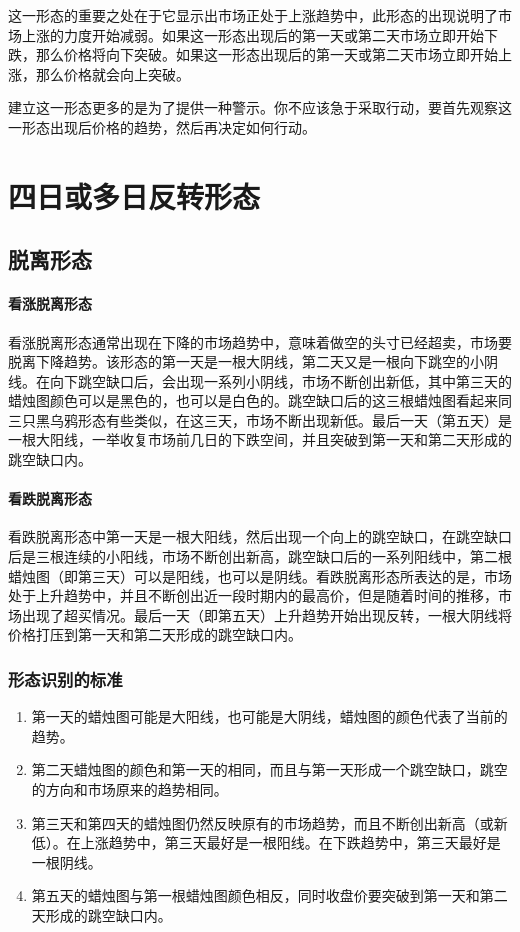 这一形态的重要之处在于它显示出市场正处于上涨趋势中，此形态的出现说明了市场上涨的力度开始减弱。如果这一形态出现后的第一天或第二天市场立即开始下跌，那么价格将向下突破。如果这一形态出现后的第一天或第二天市场立即开始上涨，那么价格就会向上突破。

\begin{tcolorbox}[title=请注意]
    建立这一形态更多的是为了提供一种警示。你不应该急于采取行动，要首先观察这一形态出现后价格的趋势，然后再决定如何行动。
\end{tcolorbox}

\section{四日或多日反转形态}
\subsection{脱离形态}
\paragraph{看涨脱离形态} 看涨脱离形态通常出现在下降的市场趋势中，意味着做空的头寸已经超卖，市场要脱离下降趋势。该形态的第一天是一根大阴线，第二天又是一根向下跳空的小阴线。在向下跳空缺口后，会出现一系列小阴线，市场不断创出新低，其中第三天的蜡烛图颜色可以是黑色的，也可以是白色的。跳空缺口后的这三根蜡烛图看起来同三只黑乌鸦形态有些类似，在这三天，市场不断出现新低。最后一天（第五天）是一根大阳线，一举收复市场前几日的下跌空间，并且突破到第一天和第二天形成的跳空缺口内。
\paragraph{看跌脱离形态} 看跌脱离形态中第一天是一根大阳线，然后出现一个向上的跳空缺口，在跳空缺口后是三根连续的小阳线，市场不断创出新高，跳空缺口后的一系列阳线中，第二根蜡烛图（即第三天）可以是阳线，也可以是阴线。看跌脱离形态所表达的是，市场处于上升趋势中，并且不断创出近一段时期内的最高价，但是随着时间的推移，市场出现了超买情况。最后一天（即第五天）上升趋势开始出现反转，一根大阴线将价格打压到第一天和第二天形成的跳空缺口内。

\subsubsection*{形态识别的标准}
\begin{enumerate}
    \item 第一天的蜡烛图可能是大阳线，也可能是大阴线，蜡烛图的颜色代表了当前的趋势。
    \item 第二天蜡烛图的颜色和第一天的相同，而且与第一天形成一个跳空缺口，跳空的方向和市场原来的趋势相同。
    \item 第三天和第四天的蜡烛图仍然反映原有的市场趋势，而且不断创出新高（或新低）。在上涨趋势中，第三天最好是一根阳线。在下跌趋势中，第三天最好是一根阴线。
    \item 第五天的蜡烛图与第一根蜡烛图颜色相反，同时收盘价要突破到第一天和第二天形成的跳空缺口内。
\end{enumerate}

